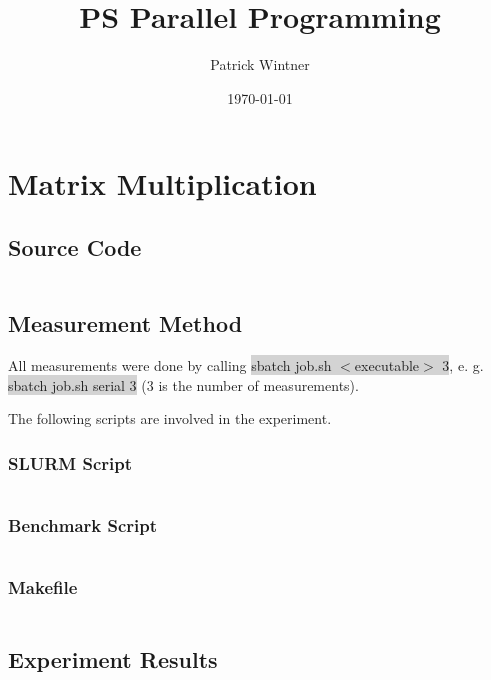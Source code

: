 \documentclass[parskip]{scrartcl}
\title{PS Parallel Programming}
\author{Patrick Wintner}
\date{\today}
\begin{document}
	\maketitle
	
	\section{Matrix Multiplication}
	\subsection{Source Code}
	\inputminted	[linenos]{c}{ex1/serial.c}
	\subsection{Measurement Method}
	All measurements were done by calling \colorbox{lightgray}{sbatch job.sh $<$executable$>$ 3}, e. g. \colorbox{lightgray}{sbatch job.sh serial 3} (3 is the number of measurements).
	
	The following scripts are involved in the experiment.
	\subsubsection{SLURM Script}
	\inputminted[linenos]{bash}{ex1/job.sh}
	\subsubsection{Benchmark Script}
	\inputminted[linenos]{bash}{ex1/benchmark.sh}
	\subsubsection{Makefile}
	\inputminted[linenos]{make}{ex1/Makefile}
	\subsection{Experiment Results}
\end{document}
